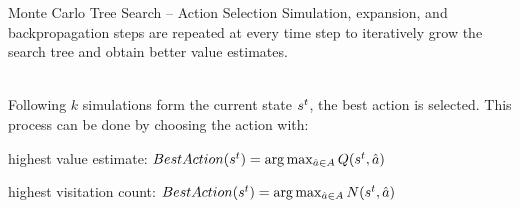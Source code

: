 \begin{frame}[t]{Monte Carlo Tree Search -- Action Selection}
    Simulation, expansion, and backpropagation steps are repeated at every time step to iteratively grow the search tree and obtain better value estimates.\\ \ \\

    \pause

    Following $k$ simulations form the current state $s^t$, the best action is selected. This process can be done by choosing the action with:
    \blist
        \item highest value estimate: $BestAction(s^t) = \arg\max_{\hat{a} \in A} Q(s^t, \hat{a})$
        \item highest visitation count: $BestAction(s^t) = \arg\max_{\hat{a} \in A} N(s^t, \hat{a})$
    \elist

\end{frame}

